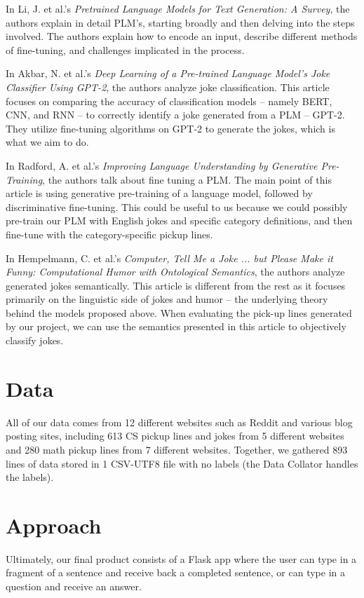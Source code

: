 \documentclass[12pt,reqno]{amsart}
\theoremstyle{plain}
\theoremstyle{definition}
\theoremstyle{remark}
\begin{document}
In Li, J. et al.'s \textit{Pretrained Language Models for Text Generation: A Survey}\cite{li2022pretrained}, the authors explain in detail PLM’s, starting broadly and then delving into the steps involved. The authors explain how to encode an input, describe different methods of fine-tuning, and challenges implicated in the process.


In Akbar, N. et al.'s \textit{Deep Learning of a Pre-trained Language Model’s Joke Classifier Using GPT-2}\cite{akbar2021deep}, the authors analyze joke classification. This article focuses on comparing the accuracy of classification models – namely BERT, CNN, and RNN – to correctly identify a joke generated from a PLM – GPT-2. They utilize fine-tuning algorithms on GPT-2 to generate the jokes, which is what we aim to do. 


In Radford, A. et al.'s \textit{Improving Language Understanding by Generative Pre-Training}\cite{radford2018improving}, the authors talk about fine tuning a PLM. The main point of this article is using generative pre-training of a language model, followed by discriminative fine-tuning. This could be useful to us because we could possibly pre-train our PLM with English jokes and specific category definitions, and then fine-tune with the category-specific pickup lines.


In Hempelmann, C. et al.'s \textit{Computer, Tell Me a Joke ... but Please Make it Funny: Computational Humor with Ontological Semantics}\cite{hempelmann2006computer}, the authors analyze generated jokes semantically. This article is different from the rest as it focuses primarily on the linguistic side of jokes and humor – the underlying theory behind the models proposed above. When evaluating the pick-up lines generated by our project, we can use the semantics presented in this article to objectively classify jokes.

\section{Data}
All of our data comes from 12 different websites such as Reddit and various blog posting sites, including 613 CS pickup lines and jokes from 5 different websites and 280 math pickup lines from 7 different websites. Together, we gathered 893 lines of data stored in 1 CSV-UTF8 file with no labels (the Data Collator handles the labels). 


\section{Approach}
Ultimately, our final product consists of a Flask app where the user can type in a fragment of a sentence and receive back a completed sentence, or can type in a question and receive an answer. 
\end{document}
